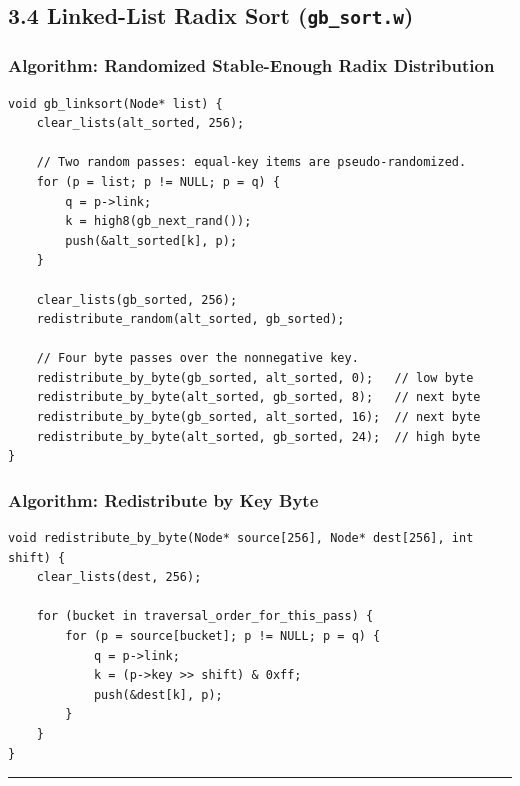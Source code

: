 \documentclass[11pt]{article}
\begin{document}
\subsection{\texorpdfstring{3.4 Linked-List Radix Sort (\texttt{gb\_sort.w})}{3.4 Linked-List Radix Sort (gb\_sort.w)}}\label{linked-list-radix-sort-gb_sort.w}

\subsubsection{Algorithm: Randomized Stable-Enough Radix Distribution}\label{algorithm-randomized-stable-enough-radix-distribution}

\begin{verbatim}
void gb_linksort(Node* list) {
    clear_lists(alt_sorted, 256);

    // Two random passes: equal-key items are pseudo-randomized.
    for (p = list; p != NULL; p = q) {
        q = p->link;
        k = high8(gb_next_rand());
        push(&alt_sorted[k], p);
    }

    clear_lists(gb_sorted, 256);
    redistribute_random(alt_sorted, gb_sorted);

    // Four byte passes over the nonnegative key.
    redistribute_by_byte(gb_sorted, alt_sorted, 0);   // low byte
    redistribute_by_byte(alt_sorted, gb_sorted, 8);   // next byte
    redistribute_by_byte(gb_sorted, alt_sorted, 16);  // next byte
    redistribute_by_byte(alt_sorted, gb_sorted, 24);  // high byte
}
\end{verbatim}

\subsubsection{Algorithm: Redistribute by Key Byte}\label{algorithm-redistribute-by-key-byte}

\begin{verbatim}
void redistribute_by_byte(Node* source[256], Node* dest[256], int shift) {
    clear_lists(dest, 256);

    for (bucket in traversal_order_for_this_pass) {
        for (p = source[bucket]; p != NULL; p = q) {
            q = p->link;
            k = (p->key >> shift) & 0xff;
            push(&dest[k], p);
        }
    }
}
\end{verbatim}

\begin{center}\rule{0.5\linewidth}{0.5pt}\end{center}
\end{document}
